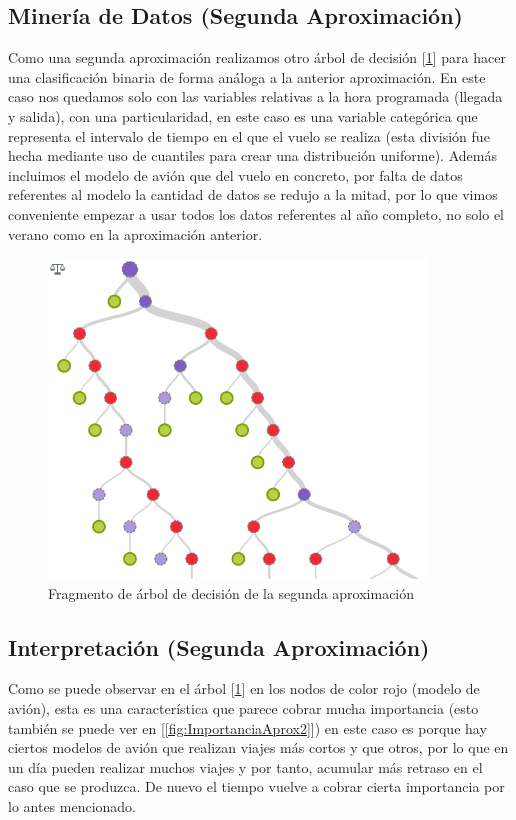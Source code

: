 \documentclass[format=acmsmall, review=false, screen=true]{acmart}
\begin{document}
\subsection{Minería de Datos (Segunda Aproximación)}

Como una segunda aproximación realizamos otro árbol de decisión [\ref{fig:ArbAprox2}] para hacer una clasificación binaria de forma análoga a la anterior aproximación. En este caso nos quedamos solo con las variables relativas a la hora programada (llegada y salida), con una particularidad, en este caso es una variable categórica que representa el intervalo de tiempo en el que el vuelo se realiza (esta división fue hecha mediante uso de cuantiles para crear una distribución uniforme). Además incluimos el modelo de avión que del vuelo en concreto, por falta de datos referentes al modelo la cantidad de datos se redujo a la mitad, por lo que vimos conveniente empezar a usar todos los datos referentes al año completo, no solo el verano como en la aproximación anterior.

\begin{figure}[htb]
	\centering
	\includegraphics[width=10cm]{ArbAprox2.png}
	\caption{Fragmento de árbol de decisión de la segunda aproximación}
	\label{fig:ArbAprox2}
\end{figure}

\subsection{Interpretación (Segunda Aproximación)}
Como se puede observar en el árbol [\ref{fig:ArbAprox2}] en los nodos de color rojo (modelo de avión), esta es una característica que parece cobrar mucha importancia (esto también se puede ver en [\ref{fig:ImportanciaAprox2}]) en este caso es porque hay ciertos modelos de avión que realizan viajes más cortos y que otros, por lo que en un día pueden realizar muchos viajes y por tanto, acumular más retraso en el caso que se produzca. De nuevo el tiempo vuelve a cobrar cierta importancia por lo antes mencionado.
\end{document}
